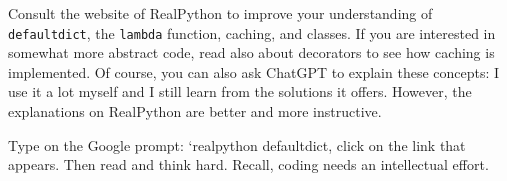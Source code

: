\documentclass[queueing-book]{subfiles}
\begin{document}
\begin{exercise}
Consult the website of RealPython to improve your understanding of \texttt{defaultdict}, the \texttt{lambda} function, caching, and classes.
If you are interested in somewhat more abstract code, read also about decorators to see how caching is implemented.
Of course, you can also ask ChatGPT to explain these concepts: I use it a lot myself and I still learn from the solutions it offers.
However, the explanations on RealPython are better and more instructive.
\begin{solution}
Type on the Google prompt: `realpython defaultdict, click on the link that appears.  Then read and think hard. Recall, coding needs an intellectual effort.
\end{solution}
\end{exercise}
\end{document}
